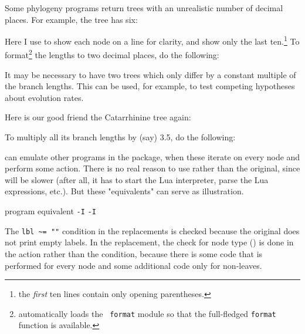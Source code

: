 
Some phylogeny programs return \nw{} trees with an unrealistic number
of decimal places. For example, the  tree has six:


Here I use \nwindent{} to show each node on a line for clarity, and
show only the last ten.\footnote{the {\em first} ten lines contain only
opening parentheses.} To format\footnote{\sched{} automatically loads the {\tt
format} module so that the full-fledged {\tt format} function is available.}
the lengths to two decimal places, do the following:


\page[no]

It may be necessary to have two trees which only differ by a constant multiple
of the branch lengths. This can be used, for example, to test competing
hypotheses about evolution rates.

Here is our good friend the Catarrhinine tree again:


To multiply all its branch lengths by (say) 3.5, do the following:



\luaed{} can emulate other programs in the package, when these
iterate on every node and perform some action. There is no real reason to use
\luaed{} rather than the original, since \luaed{} will be slower (after all, it
has to start the Lua interpreter, parse the Lua expressions, etc.). But these
"equivalents" can serve as illustration.

\startalignment[center]
\starttabulate[|l|l|]
\NC	program \NC \luaed{} equivalent \NC\NR
\HL
\NC {} 						  \NC\NR
\NC {} {\tt -I} 		 \NC\NR
\NC \topology{}						 \NC\NR
\NC \topology{} {\tt -I} 	 \NC\NR
\stoptabulate
\stopalignment

The {\tt lbl \~{}= ""} condition in the  replacements is checked
because the original  does not print empty labels. In the \topology{}
replacement, the check for node type () is done in the action rather
than the condition, because there is some code that is performed for every node
and some additional code only for non-leaves. 

